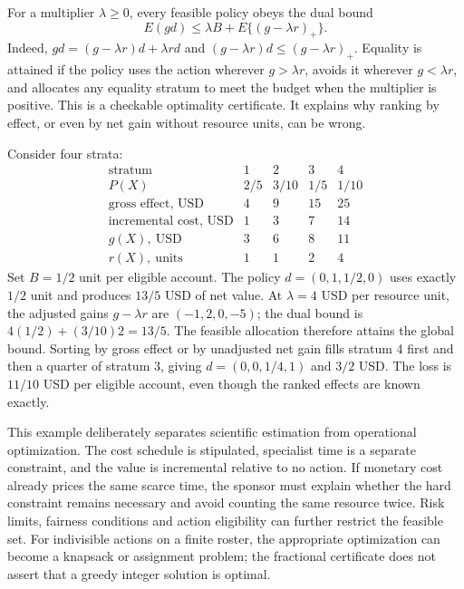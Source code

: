 For a multiplier $\lambda\geq0$, every feasible policy obeys the dual bound
\begin{equation}
 E(gd)\leq \lambda B+E\{(g-\lambda r)_+\}.
 \label{exec17:s4-resource-dual}
\end{equation}
Indeed, $gd=(g-\lambda r)d+\lambda rd$ and
$(g-\lambda r)d\leq(g-\lambda r)_+$. Equality is attained if the policy
uses the action wherever $g>\lambda r$, avoids it wherever $g<\lambda r$,
and allocates any equality stratum to meet the budget when the multiplier is
positive. This is a checkable optimality certificate. It explains why ranking
by effect, or even by net gain without resource units, can be wrong.

Consider four strata:
\[
\begin{array}{c|rrrr}
 \text{stratum}&1&2&3&4\\ \hline
 P(X)&2/5&3/10&1/5&1/10\\
 \text{gross effect, USD}&4&9&15&25\\
 \text{incremental cost, USD}&1&3&7&14\\
 g(X),\ \text{USD}&3&6&8&11\\
 r(X),\ \text{units}&1&1&2&4
\end{array}
\]
Set $B=1/2$ unit per eligible account. The policy
$d=(0,1,1/2,0)$ uses exactly $1/2$ unit and produces $13/5$ USD of net value.
At $\lambda=4$ USD per resource unit, the adjusted gains
$g-\lambda r$ are $(-1,2,0,-5)$; the dual bound is
$4(1/2)+(3/10)2=13/5$. The feasible allocation therefore attains the global
bound. Sorting by gross effect or by unadjusted net gain fills stratum 4
first and then a quarter of stratum 3, giving
$d=(0,0,1/4,1)$ and $3/2$ USD. The loss is $11/10$ USD per eligible
account, even though the ranked effects are known exactly.~\citep{exec17_s4_math}

This example deliberately separates scientific estimation from operational
optimization. The cost schedule is stipulated, specialist time is a separate
constraint, and the value is incremental relative to no action. If monetary
cost already prices the same scarce time, the sponsor must explain whether
the hard constraint remains necessary and avoid counting the same resource
twice. Risk limits, fairness conditions and action eligibility can further
restrict the feasible set. For indivisible actions on a finite roster, the
appropriate optimization can become a knapsack or assignment problem; the
fractional certificate does not assert that a greedy integer solution is
optimal.

